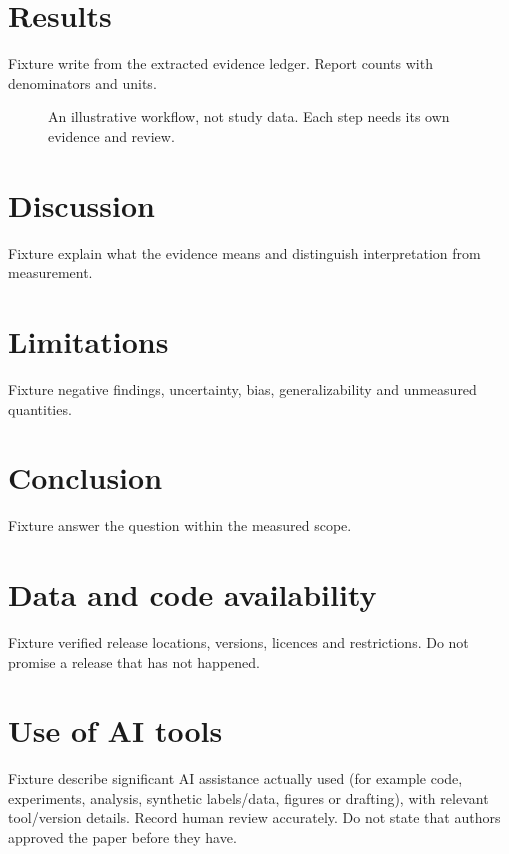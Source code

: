 \documentclass[11pt]{article}
\begin{document}
\section{Results}
Fixture write from the extracted evidence ledger. Report counts with denominators and units.
\begin{figure}[htbp]\centering
{}
\caption{An illustrative workflow, not study data. Each step needs its own evidence and review.}\end{figure}


\section{Discussion}
Fixture explain what the evidence means and distinguish interpretation from measurement.

\section{Limitations}
Fixture negative findings, uncertainty, bias, generalizability and unmeasured quantities.

\section{Conclusion}
Fixture answer the question within the measured scope.

\section*{Data and code availability}
Fixture verified release locations, versions, licences and restrictions. Do not promise a release that has not happened.

\section*{Use of AI tools}
Fixture describe significant AI assistance actually used (for example code, experiments,
analysis, synthetic labels/data, figures or drafting), with relevant tool/version details.
Record human review accurately. Do not state that authors approved the paper before they have.
\end{document}

